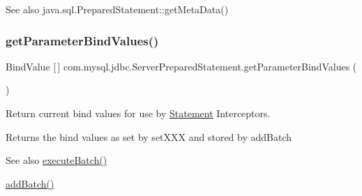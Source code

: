 \begin{DoxySeeAlso}{See also}
java.\+sql.\+Prepared\+Statement\+::get\+Meta\+Data() 
\end{DoxySeeAlso}
\mbox{\label{classcom_1_1mysql_1_1jdbc_1_1_server_prepared_statement_ac3e44f38c9fda53e8bb3d2e604298460}} 
\subsubsection{\texorpdfstring{get\+Parameter\+Bind\+Values()}{getParameterBindValues()}}
{\footnotesize\ttfamily Bind\+Value \mbox{[}$\,$\mbox{]} com.\+mysql.\+jdbc.\+Server\+Prepared\+Statement.\+get\+Parameter\+Bind\+Values (\begin{DoxyParamCaption}{ }\end{DoxyParamCaption})}

Return current bind values for use by \mbox{\hyperlink{interfacecom_1_1mysql_1_1jdbc_1_1_statement}{Statement}} Interceptors.

\begin{DoxyReturn}{Returns}
the bind values as set by set\+X\+XX and stored by add\+Batch 
\end{DoxyReturn}
\begin{DoxySeeAlso}{See also}
\mbox{\hyperlink{classcom_1_1mysql_1_1jdbc_1_1_statement_impl_acf49c07c2b02c99e25719bb916bc0b39}{execute\+Batch()}} 

\mbox{\hyperlink{classcom_1_1mysql_1_1jdbc_1_1_server_prepared_statement_a433afad2cb519d3cfcab97083295d1ce}{add\+Batch()}} 
\end{DoxySeeAlso}
\mbox{\label{classcom_1_1mysql_1_1jdbc_1_1_server_prepared_statement_afdd67ceeee80fb2e90fbe6ce94502267}} 
